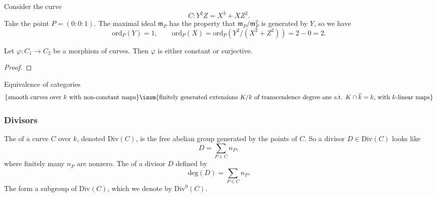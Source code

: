 \begin{example}
    Consider the curve
    \[ C : Y^2 Z = X^3 + X Z^2 . \]
    Take the point $P = (0 : 0 : 1)$. The maximal ideal $\mathfrak{m}_P$ has the property that $\mathfrak{m}_P / \mathfrak{m}_P^2$ is generated by $Y$, so we have
    \[
        \text{ord}_P(Y) = 1, \qquad
        \text{ord}_P(X) = \text{ord}_P(Y^2 / (X^2 + Z^2))
        = 2 - 0 = 2 . \]
\end{example}




\begin{theorem}
    Let $\varphi : C_1 \to C_2$ be a morphism of curves. Then $\varphi$ is either constant or surjective.
\end{theorem}

\begin{proof}
\end{proof}

\begin{theorem}
    Equivalence of categories
    \[ \{ \text{smooth curves over $k$ with non-constant maps} \} \isom \\ \{ \text{finitely generated extensions $K/k$ of transcendence degree one s.t. $K \cap \overline{k} = k$, with $k$-linear maps} \} \]
\end{theorem}





\subsubsection{Divisors}

\begin{definition}
    The  of a curve $C$ over $k$, denoted $\text{Div}(C)$, is the free abelian group generated by the points of $C$. So a divisor $D \in \text{Div}(C)$ looks like
    \[ D = \sum_{P \in C} n_P , \]
    where finitely many $n_P$ are nonzero.
    The  of a divisor $D$ defined by
    \[ \text{deg}(D) = \sum_{P \in C} n_P . \]
    The  form a subgroup of $\text{Div}(C)$, which we denote by $\text{Div}^0(C)$.
\end{definition}

